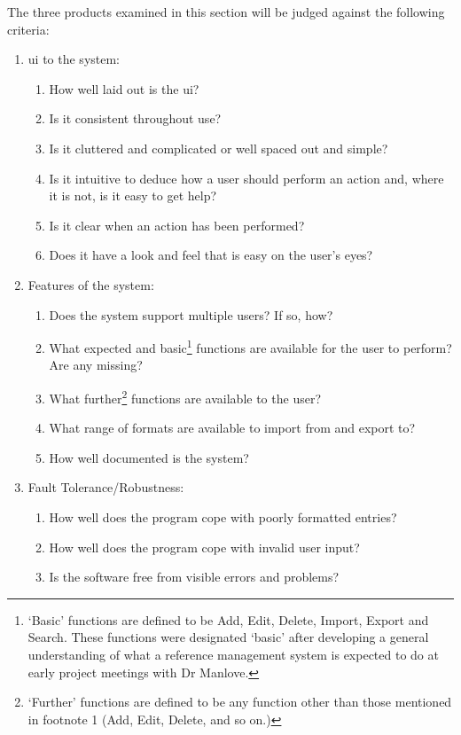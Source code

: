The three products examined in this section will be judged against the following criteria:
\begin{enumerate}
	\item \gls{ui} to the system:
	\begin{enumerate}
		\item How well laid out is the \gls{ui}? 
		\item Is it consistent throughout use?
		\item Is it cluttered and complicated or well spaced out and simple?
		\item Is it intuitive to deduce how a user should perform an action and, where it is not, is it easy to get help?
		\item Is it clear when an action has been performed?
		\item Does it have a look and feel that is easy on the user's eyes?
	\end{enumerate}
	\item Features of the system:
	\begin{enumerate}
		\item Does the system support multiple users? If so, how?
		\item What expected and basic\footnote{`Basic' functions are defined to be Add, Edit, Delete, Import, Export and Search. These functions were designated `basic' after developing a general understanding of what a reference management system is expected to do at early project meetings with Dr Manlove.} functions are available for the user to perform? Are any missing?  %
		\item What further\footnote{`Further' functions are defined to be any function other than those mentioned in footnote 1 (Add, Edit, Delete, and so on.)} functions are available to the user? 
		\item What range of formats are available to import from and export to?
		\item How well documented is the system?
	\end{enumerate}
	\item Fault Tolerance/Robustness:
	\begin{enumerate}
		\item How well does the program cope with poorly formatted entries?
		\item How well does the program cope with invalid user input?
		\item Is the software free from visible errors and problems?
	\end{enumerate}
\end{enumerate}

